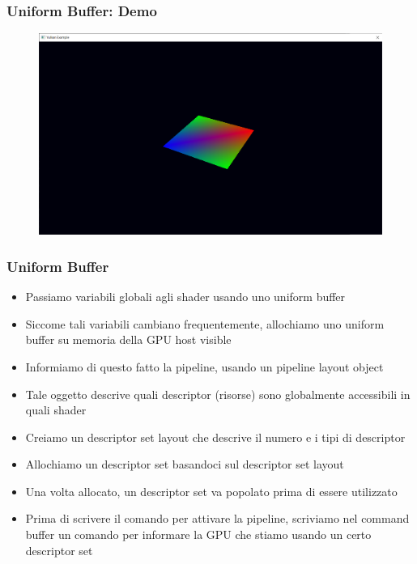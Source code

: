 \begin{frame}
\frametitle{Uniform Buffer: Demo}
\begin{figure}[ht]
    \centering
    \includegraphics[scale=0.25]{images/SlidesUniforms/RenderQuad.png}
\end{figure}
\end{frame}

\begin{frame}
\frametitle{Uniform Buffer}
\begin{itemize}
\item Passiamo variabili globali agli shader usando uno uniform buffer
\item Siccome tali variabili cambiano frequentemente, allochiamo uno uniform buffer su memoria della GPU host visible
\item Informiamo di questo fatto la pipeline, usando un pipeline layout object
\item Tale oggetto descrive quali descriptor (risorse) sono globalmente accessibili in quali shader
\item Creiamo un descriptor set layout che descrive il numero e i tipi di descriptor
\item Allochiamo un descriptor set basandoci sul descriptor set layout
\item Una volta allocato, un descriptor set va popolato prima di essere utilizzato
\item Prima di scrivere il comando per attivare la pipeline, scriviamo nel command buffer un comando per informare la GPU che stiamo usando un certo descriptor set
\end{itemize}
\end{frame}
